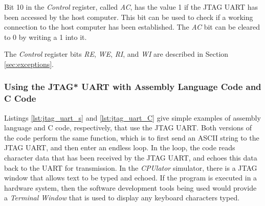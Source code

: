 Bit 10 in the {\it Control} register, called {\it AC}, has the value 1 if the JTAG UART has been
accessed by the host computer. This bit can be used to check if a working connection to
the host computer has been established. The {\it AC} bit can be cleared to 0 by writing a 1
into it.

The {\it Control} register bits {\it RE}, {\it WE}, {\it RI}, and {\it WI} are described 
in Section \ref{sec:exceptions}.

\subsubsection{Using the JTAG* UART with Assembly Language Code and C Code}

Listings \ref{lst:jtag_uart_s} and \ref{lst:jtag_uart_C} give simple examples of 
assembly language and C code, respectively, that use the JTAG UART. Both versions of the
code perform the same function, which is to first send an ASCII string to the JTAG UART,
and then enter an endless loop. In the loop, the code reads character data that has 
been received by the JTAG UART, and echoes this data back to the UART for transmission. In
the {\it CPUlator} simulator, there is a JTAG window that allows text to be typed and
echoed. If the program is executed in a hardware system, then the software development
tools being used would provide a {\it Terminal Window} that is used to display any 
keyboard characters typed.


